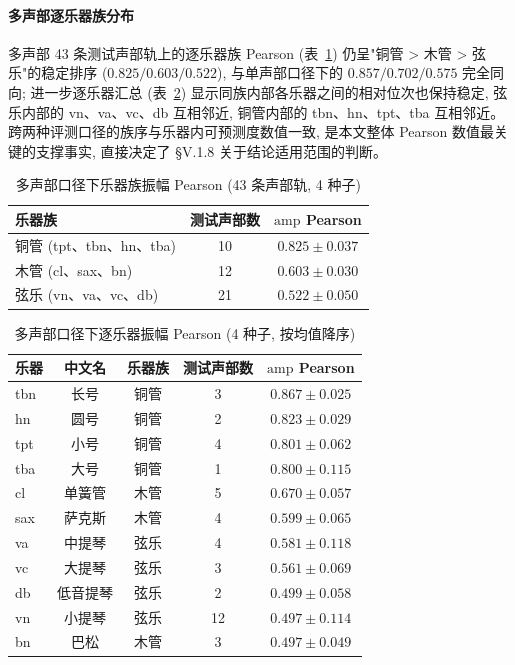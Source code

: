 \documentclass[a4paper, UTF8, zihao=-4, fontset=fandol]{ctexart}
\begin{document}
\paragraph{多声部逐乐器族分布}\quad
多声部 43 条测试声部轨上的逐乐器族 Pearson (表~\ref{tab:per-family-poly}) 仍呈"铜管 > 木管 > 弦乐"的稳定排序 ($0.825 / 0.603 / 0.522$), 与单声部口径下的 $0.857 / 0.702 / 0.575$ 完全同向; 进一步逐乐器汇总 (表~\ref{tab:per-inst}) 显示同族内部各乐器之间的相对位次也保持稳定, 弦乐内部的 vn、va、vc、db 互相邻近, 铜管内部的 tbn、hn、tpt、tba 互相邻近。 跨两种评测口径的族序与乐器内可预测度数值一致, 是本文整体 Pearson 数值最关键的支撑事实, 直接决定了 §V.1.8 关于结论适用范围的判断。

\begin{table}[htbp]\centering
\caption{多声部口径下乐器族振幅 Pearson (43 条声部轨, 4 种子)}\label{tab:per-family-poly}
\begin{tabular}{lcc}
\toprule
乐器族 & 测试声部数 & $\mathrm{amp}$ Pearson \\
\midrule
铜管 (tpt、tbn、hn、tba) & 10 & $0.825 \pm 0.037$ \\
木管 (cl、sax、bn) & 12 & $0.603 \pm 0.030$ \\
弦乐 (vn、va、vc、db) & 21 & $0.522 \pm 0.050$ \\
\bottomrule
\end{tabular}
\end{table}

\begin{table}[htbp]\centering
\caption{多声部口径下逐乐器振幅 Pearson (4 种子, 按均值降序)}\label{tab:per-inst}
\begin{tabular}{lcccc}
\toprule
乐器 & 中文名 & 乐器族 & 测试声部数 & $\mathrm{amp}$ Pearson \\
\midrule
tbn & 长号 & 铜管 & 3 & $0.867 \pm 0.025$ \\
hn & 圆号 & 铜管 & 2 & $0.823 \pm 0.029$ \\
tpt & 小号 & 铜管 & 4 & $0.801 \pm 0.062$ \\
tba & 大号 & 铜管 & 1 & $0.800 \pm 0.115$ \\
cl & 单簧管 & 木管 & 5 & $0.670 \pm 0.057$ \\
sax & 萨克斯 & 木管 & 4 & $0.599 \pm 0.065$ \\
va & 中提琴 & 弦乐 & 4 & $0.581 \pm 0.118$ \\
vc & 大提琴 & 弦乐 & 3 & $0.561 \pm 0.069$ \\
db & 低音提琴 & 弦乐 & 2 & $0.499 \pm 0.058$ \\
vn & 小提琴 & 弦乐 & 12 & $0.497 \pm 0.114$ \\
bn & 巴松 & 木管 & 3 & $0.497 \pm 0.049$ \\
\bottomrule
\end{tabular}
\end{table}
\end{document}
